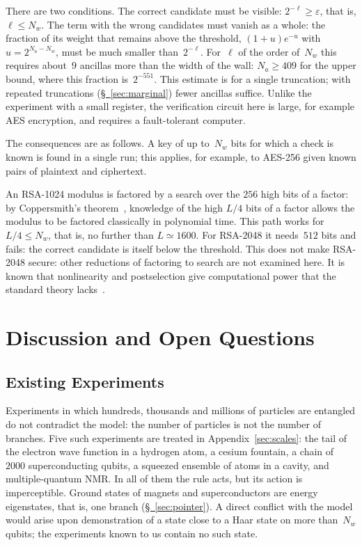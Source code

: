 \documentclass[11pt,a4paper]{article}
\begin{document}
There are two conditions. The correct candidate must be visible: $2^{-\ell}\ge\varepsilon$, that is, $\ell\le N_w$. The term with the wrong candidates must vanish as a whole: the fraction of its weight that remains above the threshold, $(1+u)e^{-u}$ with $u=2^{N_a-N_w}$, must be much smaller than~$2^{-\ell}$. For~$\ell$ of the order of~$N_w$ this requires about~$9$ ancillas more than the width of the wall: $N_a\ge409$ for the upper bound, where this fraction is~$2^{-551}$. This estimate is for a single truncation; with repeated truncations (\hyperref[sec:marginal]{\S~\ref*{sec:marginal}}) fewer ancillas suffice. Unlike the experiment with a small register, the verification circuit here is large, for example AES encryption, and requires a fault-tolerant computer.

The consequences are as follows. A key of up to~$N_w$ bits for which a check is known is found in a single run; this applies, for example, to AES-256 given known pairs of plaintext and ciphertext.

An RSA-1024 modulus is factored by a search over the $256$ high bits of a factor: by Coppersmith's theorem~\cite{coppersmith1997}, knowledge of the high $L/4$ bits of a factor allows the modulus to be factored classically in polynomial time. This path works for $L/4\le N_w$, that is, no further than $L\simeq1600$. For RSA-2048 it needs~$512$ bits and fails: the correct candidate is itself below the threshold. This does not make RSA-2048 secure: other reductions of factoring to search are not examined here. It is known that nonlinearity and postselection give computational power that the standard theory lacks~\cite{abramslloyd1998,aaronson2005}.

\section{Discussion and Open Questions}
\label{sec:discussion}

\subsection{Existing Experiments}
\label{sec:existing}

Experiments in which hundreds, thousands and millions of particles are entangled do not contradict the model: the number of particles is not the number of branches. Five such experiments are treated in Appendix~\ref{sec:scales}: the tail of the electron wave function in a hydrogen atom, a cesium fountain, a chain of~$2000$ superconducting qubits, a squeezed ensemble of atoms in a cavity, and multiple-quantum NMR. In all of them the rule acts, but its action is imperceptible. Ground states of magnets and superconductors are energy eigenstates, that is, one branch (\hyperref[sec:pointer]{\S~\ref*{sec:pointer}}). A direct conflict with the model would arise upon demonstration of a state close to a Haar state on more than~$N_w$ qubits; the experiments known to us contain no such state.
\end{document}
